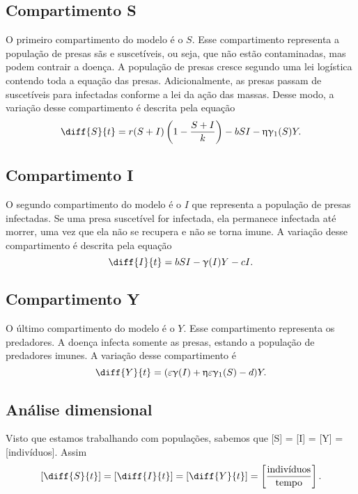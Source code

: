 \documentclass{article}
\begin{document}
\subsection{Compartimento S}
O primeiro compartimento do modelo é o $S$. Esse compartimento representa a população de presas sãs e suscetíveis, ou seja, que não estão contaminadas, mas podem contrair a doença. A população de presas cresce segundo uma lei logística contendo toda a equação das presas. Adicionalmente, as presas passam de suscetíveis para infectadas conforme a lei da ação das massas. Desse modo, a variação desse compartimento é descrita pela equação
\begin{equation*}
    \diff{S}{t} = r(S+I) \left( 1 - \dfrac{S+I}{k} \right) - bSI - \upeta \upgamma_1(S)Y.
\end{equation*}

\subsection{Compartimento I}
O segundo compartimento do modelo é o $I$ que representa a população de presas infectadas. Se uma presa suscetível for infectada, ela permanece infectada até morrer, uma vez que ela não se recupera e não se torna imune. A variação desse compartimento é descrita pela equação
\begin{equation*}
    \diff{I}{t} = bSI - \upgamma(I)Y - cI.
\end{equation*}

\subsection{Compartimento Y}
O último compartimento do modelo é o $Y$. Esse compartimento representa  os predadores. A doença infecta somente as presas, estando a população de predadores imunes. A variação desse compartimento é
\begin{equation*}
    \diff{Y}{t} = (\varepsilon \upgamma(I) + \upeta \varepsilon \upgamma_1(S) - d)Y.
\end{equation*}

\subsection{Análise dimensional}
Visto que estamos trabalhando com populações, sabemos que [S] = [I] = [Y] = [indivíduos]. Assim
\begin{equation*}
    \left[ \diff{S}{t} \right] = \left[ \diff{I}{t} \right] = \left[ \diff{Y}{t} \right] = \left[ \dfrac{\text{indivíduos}}{\text{tempo}}\right].
\end{equation*}
\end{document}
